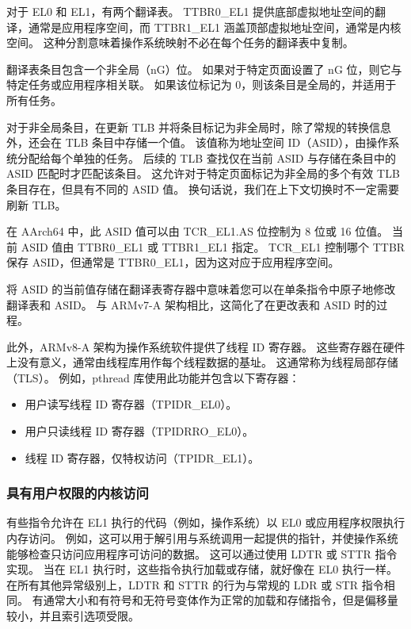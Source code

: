 对于 EL0 和 EL1，有两个翻译表。
TTBR0\_EL1 提供底部虚拟地址空间的翻译，通常是应用程序空间，而 TTBR1\_EL1 涵盖顶部虚拟地址空间，通常是内核空间。
这种分割意味着操作系统映射不必在每个任务的翻译表中复制。

翻译表条目包含一个非全局（nG）位。
如果对于特定页面设置了 nG 位，则它与特定任务或应用程序相关联。
如果该位标记为 0，则该条目是全局的，并适用于所有任务。

对于非全局条目，在更新 TLB 并将条目标记为非全局时，除了常规的转换信息外，还会在 TLB 条目中存储一个值。
该值称为地址空间 ID（ASID），由操作系统分配给每个单独的任务。
后续的 TLB 查找仅在当前 ASID 与存储在条目中的 ASID 匹配时才匹配该条目。
这允许对于特定页面标记为非全局的多个有效 TLB 条目存在，但具有不同的 ASID 值。
换句话说，我们在上下文切换时不一定需要刷新 TLB。

在 AArch64 中，此 ASID 值可以由 TCR\_EL1.AS 位控制为 8 位或 16 位值。
当前 ASID 值由 TTBR0\_EL1 或 TTBR1\_EL1 指定。
TCR\_EL1 控制哪个 TTBR 保存 ASID，但通常是 TTBR0\_EL1，因为这对应于应用程序空间。

\begin{Tcbox}[title={Note}]
  将 ASID 的当前值存储在翻译表寄存器中意味着您可以在单条指令中原子地修改翻译表和 ASID。
  与 ARMv7-A 架构相比，这简化了在更改表和 ASID 时的过程。
\end{Tcbox}

此外，ARMv8-A 架构为操作系统软件提供了线程 ID 寄存器。
这些寄存器在硬件上没有意义，通常由线程库用作每个线程数据的基址。
这通常称为线程局部存储（TLS）。
例如，pthread 库使用此功能并包含以下寄存器：

\begin{itemize}
\item
  用户读写线程 ID 寄存器（TPIDR\_EL0）。
\item
  用户只读线程 ID 寄存器（TPIDRRO\_EL0）。
\item
  线程 ID 寄存器，仅特权访问（TPIDR\_EL1）。
\end{itemize}

\subsubsection{具有用户权限的内核访问}

有些指令允许在 EL1 执行的代码（例如，操作系统）以 EL0 或应用程序权限执行内存访问。
例如，这可以用于解引用与系统调用一起提供的指针，并使操作系统能够检查只访问应用程序可访问的数据。
这可以通过使用 LDTR 或 STTR 指令实现。
当在 EL1 执行时，这些指令执行加载或存储，就好像在 EL0 执行一样。
在所有其他异常级别上，LDTR 和 STTR 的行为与常规的 LDR 或 STR 指令相同。
有通常大小和有符号和无符号变体作为正常的加载和存储指令，但是偏移量较小，并且索引选项受限。

